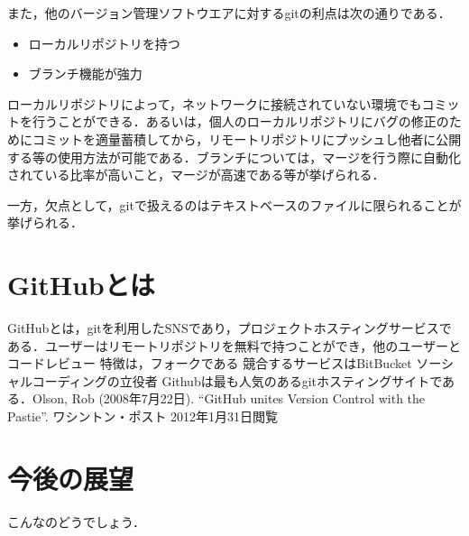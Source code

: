 \documentclass[a4paper,10pt,twocolumn]{jsarticle}
\begin{document}
また，他のバージョン管理ソフトウエアに対するgitの利点は次の通りである．

\begin{itemize}
\item ローカルリポジトリを持つ
\item ブランチ機能が強力
\end{itemize}

ローカルリポジトリによって，ネットワークに接続されていない環境でもコミットを行うことができる．あるいは，個人のローカルリポジトリにバグの修正のためにコミットを適量蓄積してから，リモートリポジトリにプッシュし他者に公開する等の使用方法が可能である．ブランチについては，マージを行う際に自動化されている比率が高いこと，マージが高速である等が挙げられる．

一方，欠点として，gitで扱えるのはテキストベースのファイルに限られることが挙げられる．

\section{GitHubとは}
GitHubとは，gitを利用したSNSであり，プロジェクトホスティングサービスである．ユーザーはリモートリポジトリを無料で持つことができ，他のユーザーと
コードレビュー
特徴は，フォークである
競合するサービスはBitBucket
ソーシャルコーディングの立役者
Githubは最も人気のあるgitホスティングサイトである．Olson, Rob (2008年7月22日). “GitHub unites Version Control with the Pastie”. ワシントン・ポスト 2012年1月31日閲覧


\section{今後の展望}
こんなのどうでしょう．

\small
\begin{thebibliography}{99}
\end{thebibliography}
\end{document}
